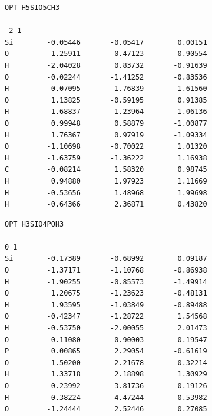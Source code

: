 \documentclass[
  digital, %
  table,   %
  lof,     %
  lot,     %
]{fithesis3}
\begin{document}
\begin{lstlisting}[frame=single, caption={\ce{H5SiO5CH3}},label=DescriptiveLabel]
OPT H5SIO5CH3

-2 1
Si        -0.05446       -0.05417        0.00151
O         -1.25911        0.47123       -0.90554
H         -2.04028        0.83732       -0.91639
O         -0.02244       -1.41252       -0.83536
H          0.07095       -1.76839       -1.61560
O          1.13825       -0.59195        0.91385
H          1.68837       -1.23964        1.06136
O          0.99948        0.58879       -1.00877
H          1.76367        0.97919       -1.09334
O         -1.10698       -0.70022        1.01320
H         -1.63759       -1.36222        1.16938
C         -0.08214        1.58320        0.98745
H          0.94880        1.97923        1.11669
H         -0.53656        1.48968        1.99698
H         -0.64366        2.36871        0.43820

 \end{lstlisting}
 \newpage
 

\begin{lstlisting}[frame=single, caption={\ce{H3SiO4(H2PO3)}},label=DescriptiveLabel]
OPT H3SIO4POH3

0 1
Si        -0.17389       -0.68992        0.09187
O         -1.37171       -1.10768       -0.86938
H         -1.90255       -0.85573       -1.49914
O          1.20675       -1.23623       -0.48131
H          1.93595       -1.03849       -0.89488
O         -0.42347       -1.28722        1.54568
H         -0.53750       -2.00055        2.01473
O         -0.11080        0.90003        0.19547
P          0.00865        2.29054       -0.61619
O          1.50200        2.21678        0.32214
H          1.33718        2.18898        1.30929
O          0.23992        3.81736        0.19126
H          0.38224        4.47244       -0.53982
O         -1.24444        2.52446        0.27085
 \end{lstlisting}

\newpage
\end{document}
